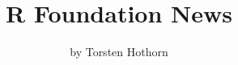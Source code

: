 \title{R Foundation News}
\author{by Torsten Hothorn}

\maketitle





\address{%
Torsten Hothorn\\
\\%
\\
%
%
%
%
}
